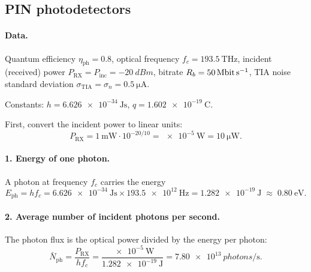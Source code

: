 
\subsection{PIN photodetectors}
\label{sec:2_7}

\paragraph{Data.}
Quantum efficiency $\eta_\mathrm{ph} = 0.8$, optical frequency $f_c = \SI{193.5}{\tera\hertz}$,
incident (received) power $P_\mathrm{RX} = P_\mathrm{inc} = \SI{-20}{dBm}$, bitrate $R_b = \SI{50}{\mega\bit\per\second}$,
TIA noise standard deviation $\sigma_\mathrm{TIA} = \sigma_n = \SI{0.5}{\micro\ampere}$.

\noindent Constants: $h = \SI{6.626e-34}{\joule\second}$, $q = \SI{1.602e-19}{\coulomb}$.

\noindent First, convert the incident power to linear units:
\begin{equation}
  P_\mathrm{RX} = \SI{1}{\milli\watt}\cdot 10^{-20/10} = \SI{e-5}{\watt} = \SI{10}{\micro\watt}.
\end{equation}

\paragraph{1. Energy of one photon.}
A photon at frequency $f_c$ carries the energy
\begin{equation}
  E_\mathrm{ph} = h f_c = \SI{6.626e-34}{\joule\second}\times\SI{193.5e12}{\hertz}
  = \SI{1.282e-19}{\joule} \;\approx\; \SI{0.80}{\electronvolt}.
\end{equation}

\paragraph{2. Average number of incident photons per second.}
The photon flux is the optical power divided by the energy per photon:
\begin{equation}
  \bar N_\mathrm{ph} = \frac{P_\mathrm{RX}}{h f_c}
  = \frac{\SI{e-5}{\watt}}{\SI{1.282e-19}{\joule}}
  = \SI{7.80e13}{photons\per\second}.
\end{equation}

